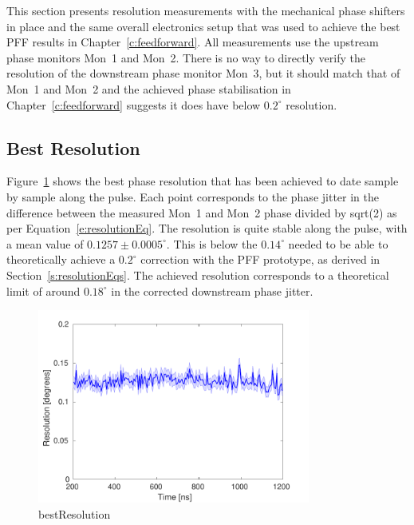 
This section presents resolution measurements with the mechanical phase shifters in place and the same overall electronics setup that was used to achieve the best PFF results in Chapter~\ref{c:feedforward}. All measurements use the upstream phase monitors Mon~1 and Mon~2. There is no way to directly verify the resolution of the downstream phase monitor Mon~3, but it should match that of Mon~1 and Mon~2 and the achieved phase stabilisation in Chapter~\ref{c:feedforward} suggests it does have below \(0.2^\circ\) resolution.

\subsection{Best Resolution}
\label{ss:bestRes}

Figure~\ref{f:bestResolution} shows the best phase resolution that has been achieved to date sample by sample along the pulse. Each point corresponds to the phase jitter in the difference between the measured Mon~1 and Mon~2 phase divided by sqrt(2) as per Equation~\ref{e:resolutionEq}.  The resolution is quite stable along the pulse, with a mean value of \(0.1257\pm0.0005^\circ\). This is below the \(0.14^\circ\) needed to be able to theoretically achieve a \(0.2^\circ\) correction with the PFF prototype, as derived in Section~\ref{s:resolutionEqs}. The achieved resolution corresponds to a theoretical limit of around \(0.18^\circ\) in the corrected downstream phase jitter.

\begin{figure}
  \centering
  \includegraphics[width=0.8\textwidth]{Figures/phaseMons/bestResolution}
  \caption{bestResolution}
  \label{f:bestResolution}
\end{figure}

